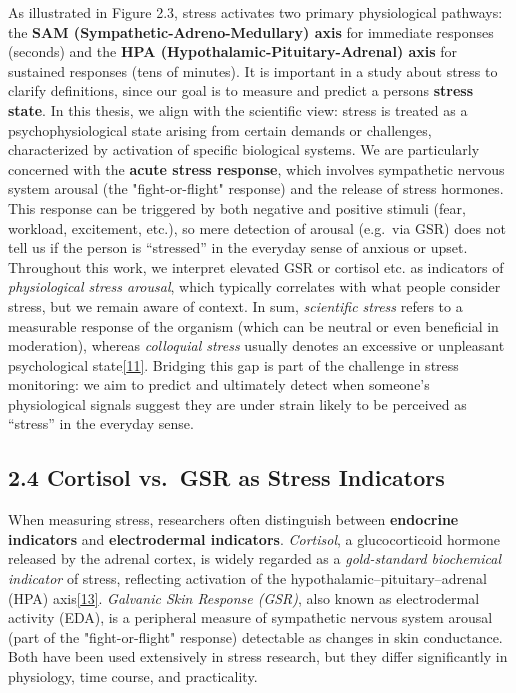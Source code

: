 \documentclass[12pt,a4paper]{article}
\begin{document}
As illustrated in Figure 2.3, stress activates two primary physiological pathways: the \textbf{SAM (Sympathetic-Adreno-Medullary) axis} for immediate responses (seconds) and the \textbf{HPA (Hypothalamic-Pituitary-Adrenal) axis} for sustained responses (tens of minutes). It is important in a study about stress to clarify definitions, since our goal is to measure and predict a person\textquotesingle s \textbf{stress state}. In this thesis, we align with the scientific view: stress is treated as a psychophysiological state arising from certain demands or challenges, characterized by activation of specific biological systems. We are particularly concerned with the \textbf{acute stress response}, which involves sympathetic nervous system arousal (the "fight-or-flight" response) and the release of stress hormones. This response can be triggered by both negative and positive stimuli (fear, workload, excitement, etc.), so mere detection of arousal (e.g.~via GSR) does not tell us if the person is ``stressed'' in the everyday sense of anxious or upset. Throughout this work, we interpret elevated GSR or cortisol etc. as indicators of \emph{physiological stress arousal}, which typically correlates with what people consider stress, but we remain aware of context. In sum, \emph{scientific stress} refers to a measurable response of the organism (which can be neutral or even beneficial in moderation), whereas \emph{colloquial stress} usually denotes an excessive or unpleasant psychological state\href{Selye1956}{{[}11{]}}. Bridging this gap is part of the challenge in stress monitoring: we aim to predict and ultimately detect when someone's physiological signals suggest they are under strain likely to be perceived as ``stress'' in the everyday sense.

\subsection{2.4 Cortisol vs.~GSR as Stress Indicators}\label{cortisol-vs.-gsr-as-stress-indicators}

When measuring stress, researchers often distinguish between \textbf{endocrine indicators} and \textbf{electrodermal indicators}. \emph{Cortisol}, a glucocorticoid hormone released by the adrenal cortex, is widely regarded as a \emph{gold-standard biochemical indicator} of stress, reflecting activation of the hypothalamic--pituitary--adrenal (HPA) axis\href{https://www.sciencedirect.com/science/article/pii/S136984782500244X\#:~:text=,1994\%29\%2C\%20whereas}{{[}13{]}}. \emph{Galvanic Skin Response (GSR)}, also known as electrodermal activity (EDA), is a peripheral measure of sympathetic nervous system arousal (part of the "fight-or-flight" response) detectable as changes in skin conductance. Both have been used extensively in stress research, but they differ significantly in physiology, time course, and practicality.
\end{document}
